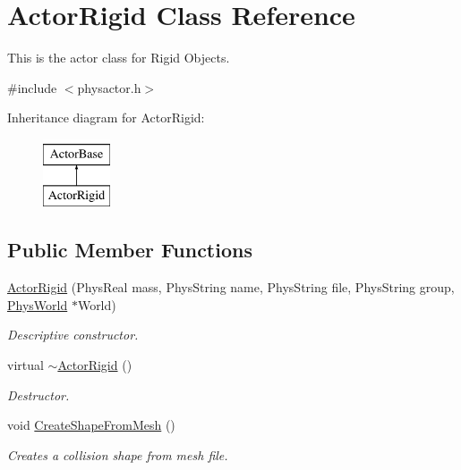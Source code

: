 \hypertarget{classActorRigid}{
\section{ActorRigid Class Reference}
\label{d5/d10/classActorRigid}
}


This is the actor class for Rigid Objects.  




{\ttfamily \#include $<$physactor.h$>$}

Inheritance diagram for ActorRigid:\begin{figure}[H]
\begin{center}
\leavevmode
\includegraphics[height=2cm]{d5/d10/classActorRigid}
\end{center}
\end{figure}
\subsection*{Public Member Functions}
\begin{DoxyCompactItemize}
\item 
\hyperlink{classActorRigid_a8313ce86811d7233b8672f562306976c}{ActorRigid} (PhysReal mass, PhysString name, PhysString file, PhysString group, \hyperlink{classPhysWorld}{PhysWorld} $\ast$World)
\begin{DoxyCompactList}\small\item\em Descriptive constructor. \item\end{DoxyCompactList}\item 
virtual \hyperlink{classActorRigid_a36b9eb18fc9e83769a48eb1c34312889}{$\sim$ActorRigid} ()
\begin{DoxyCompactList}\small\item\em Destructor. \item\end{DoxyCompactList}\item 
void \hyperlink{classActorRigid_a1a1b7ca97c69bb5420a76116c388b3d1}{CreateShapeFromMesh} ()
\begin{DoxyCompactList}\small\item\em Creates a collision shape from mesh file. \item\end{DoxyCompactList}\end{DoxyCompactItemize}
